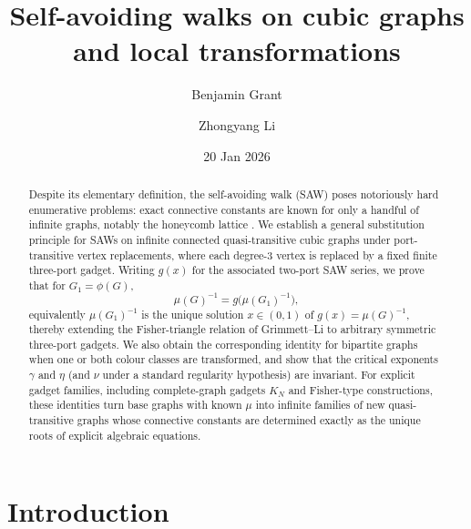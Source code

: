\documentclass[12pt]{amsart}
\theoremstyle{plain}
\numberwithin{equation}{section}
\numberwithin{theorem}{section}
\numberwithin{figure}{section}
\begin{document}
\title[SAWs on cubic graphs]
{Self-avoiding walks on cubic graphs and local transformations}
\author[Grant]{Benjamin Grant}
\address{Department of Mathematics, University of Connecticut} 

\author[Li]{Zhongyang Li}


\begin{abstract}
Despite its elementary definition, the self-avoiding walk (SAW) poses notoriously hard
enumerative problems: exact connective constants are known for only a handful of infinite
graphs, notably the honeycomb lattice \cite{ds}.
We establish a general substitution principle for SAWs on infinite connected quasi-transitive
cubic graphs under port-transitive vertex replacements, where each degree-$3$ vertex is
replaced by a fixed finite three-port gadget.
Writing $g(x)$ for the associated two-port SAW series, we prove that for $G_1=\phi(G)$,
\[
\mu(G)^{-1}=g\bigl(\mu(G_1)^{-1}\bigr),
\]
equivalently $\mu(G_1)^{-1}$ is the unique solution $x\in(0,1)$ of $g(x)=\mu(G)^{-1}$,
thereby extending the Fisher-triangle relation of Grimmett--Li to arbitrary symmetric
three-port gadgets.
We also obtain the corresponding identity for bipartite graphs when one or both colour
classes are transformed, and show that the critical exponents $\gamma$ and $\eta$ (and
$\nu$ under a standard regularity hypothesis) are invariant.
For explicit gadget families, including complete-graph gadgets $K_N$ and Fisher-type
constructions, these identities turn base graphs with known $\mu$ into infinite families
of new quasi-transitive graphs whose connective constants are determined exactly as the
unique roots of explicit algebraic equations.
\end{abstract}




\date{20 Jan 2026} %


\maketitle


\section{Introduction}\label{sec:intro}
\end{document}
